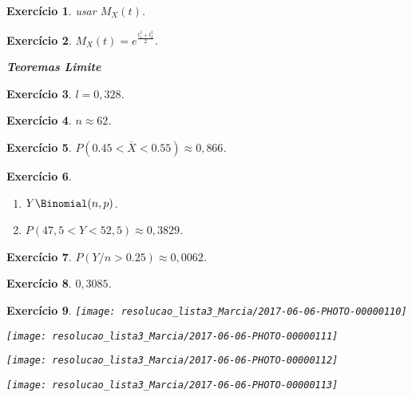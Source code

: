 \documentclass[letter,11pt]{article}
\newtheorem{exer}{Exercício}
\begin{document}
\medskip
\begin{exer} \rm
usar $M_X(t)$.
\end{exer}


\medskip
\begin{exer} \rm
$M_X(t) = e^{\frac{t_1^2 + t_2^2}{2}}$.
\end{exer}


\medskip
\medskip
\noindent \textit{\textbf{Teoremas Limite}}

\medskip
\begin{exer} \rm
$l = 0,328$.
\end{exer}


\medskip
\begin{exer} \rm
$n \approx 62$.
\end{exer}


\medskip
\begin{exer} \rm
$P(0.45 < \overline{X} < 0.55) \approx 0,866$.
\end{exer}


\medskip
\begin{exer} \rm
\begin{enumerate}[\bf(a)]
  \item $Y \Binomial(n, p)$.
  \item $P(47,5 < Y < 52,5) \approx 0,3829$.
\end{enumerate}
\end{exer}


\medskip
\begin{exer} \rm
$P(Y/n > 0.25) \approx 0,0062$.
\end{exer}


\medskip
\begin{exer} \rm
$0,3085$.
\end{exer}


\medskip
\begin{exer} \rm

\newpage

\texttt{[image: resolucao\_lista3\_Marcia/2017-06-06-PHOTO-00000110]}

\texttt{[image: resolucao\_lista3\_Marcia/2017-06-06-PHOTO-00000111]}

\texttt{[image: resolucao\_lista3\_Marcia/2017-06-06-PHOTO-00000112]}

\texttt{[image: resolucao\_lista3\_Marcia/2017-06-06-PHOTO-00000113]}
\end{exer}
\end{document}
